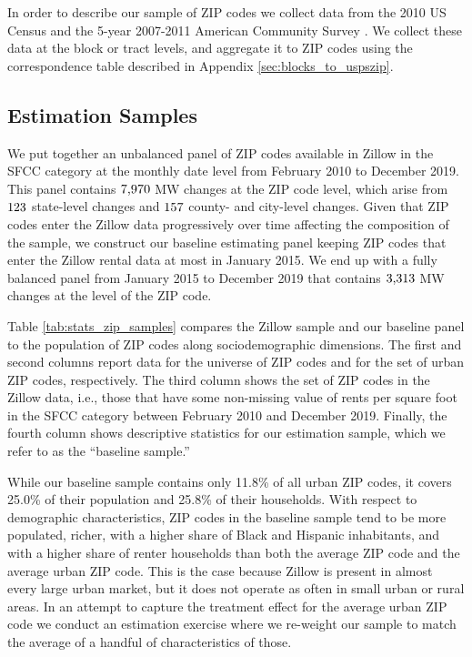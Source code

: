 In order to describe our sample of ZIP codes we collect data from the 
2010 US Census \parencite{CensusDecennial} and
the 5-year 2007-2011 American Community Survey \parencite[ACS;][]{CensusACS}.
We collect these data at the block or tract levels, and aggregate it to ZIP codes
using the correspondence table described in Appendix \ref{sec:blocks_to_uspszip}.

\subsection{Estimation Samples}\label{sec:data_final_panel}

We put together an unbalanced panel of ZIP codes available in Zillow in the SFCC 
category at the monthly date level from February 2010 to December 2019.
This panel contains $\textnormal{7,970}$ MW changes at the ZIP code level, 
which arise from $\textnormal{123}$ state-level changes and 
$\textnormal{157}$ county- and city-level changes.
Given that ZIP codes enter the Zillow data progressively over time affecting 
the composition of the sample,
we construct our baseline estimating panel keeping ZIP codes that enter the 
Zillow rental data at most in January 2015.
We end up with a fully balanced panel from January 2015 to December 2019
that contains $\textnormal{3,313}$ MW changes at the level of the ZIP code.

Table \ref{tab:stats_zip_samples} compares the Zillow sample and our baseline 
panel to the population of ZIP codes along sociodemographic dimensions. 
The first and second columns report data for the universe of ZIP codes and 
for the set of urban ZIP codes, respectively.
The third column shows the set of ZIP codes in the Zillow data, i.e., those 
that have some non-missing value of rents per square foot in the SFCC category 
between February 2010 and December 2019.
Finally, the fourth column shows descriptive statistics for our estimation 
sample, which we refer to as the ``baseline sample.''

While our baseline sample contains only 11.8\% of all urban ZIP codes, it covers
25.0\% of their population and 25.8\% of their households.
With respect to demographic characteristics, ZIP codes in the baseline sample 
tend to be more populated, richer, with a higher share of Black and Hispanic 
inhabitants, and with a higher share of renter households than both 
the average ZIP code and the average urban ZIP code.
This is the case because Zillow is present in almost every large urban market, 
but it does not operate as often in small urban or rural areas.
In an attempt to capture the treatment effect for the average urban ZIP code 
we conduct an estimation exercise where we re-weight our sample to match the 
average of a handful of characteristics of those.

